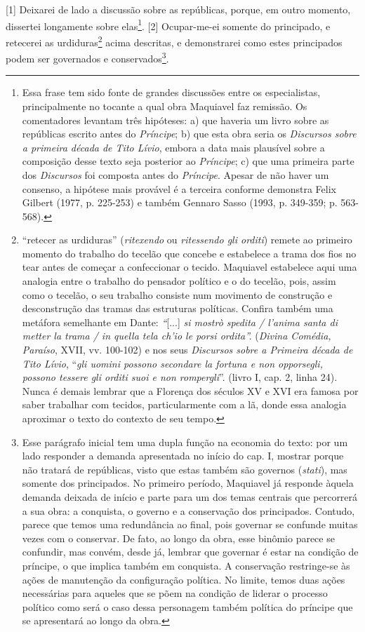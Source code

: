 {[}1{]} Deixarei de lado a discussão sobre as repúblicas, porque, em
outro momento, dissertei longamente sobre elas\footnote{Essa frase tem
  sido fonte de grandes discussões entre os especialistas,
  principalmente no tocante a qual obra Maquiavel faz remissão. Os
  comentadores levantam três hipóteses: a) que haveria um livro sobre as
  repúblicas escrito antes do \emph{Príncipe}; b) que esta obra seria os
  \emph{Discursos sobre a primeira década de Tito Lívio}, embora a data
  mais plausível sobre a composição desse texto seja posterior ao
  \emph{Príncipe}; c) que uma primeira parte dos \emph{Discursos} foi
  composta antes do \emph{Príncipe}. Apesar de não haver um consenso, a
  hipótese mais provável é a terceira conforme demonstra Felix Gilbert
  (1977, p. 225-253) e também Gennaro Sasso (1993, p. 349-359; p.
  563-568).}. {[}2{]} Ocupar-me-ei somente do principado, e retecerei as
urdiduras\footnote{``retecer as urdiduras'' (\emph{ritexendo} ou
  \emph{ritessendo gli orditi}) remete ao primeiro momento do trabalho
  do tecelão que concebe e estabelece a trama dos fios no tear antes de
  começar a confeccionar o tecido. Maquiavel estabelece aqui uma
  analogia entre o trabalho do pensador político e o do tecelão, pois,
  assim como o tecelão, o seu trabalho consiste num movimento de
  construção e desconstrução das tramas das estruturas políticas.
  Confira também uma metáfora semelhante em Dante: \emph{``}{[}...{]}
  \emph{si mostrò spedita / l'anima santa di metter la trama / in quella
  tela ch'io le porsi ordita''.} (\emph{Divina Comédia, Paraíso}, XVII,
  vv. 100-102) e nos seus \emph{Discursos sobre a Primeira década de
  Tito Lívio}, ``\emph{gli uomini possono secondare la fortuna e non
  opporsegli, possono tessere gli orditi suoi e non rompergli}''. (livro
  I, cap. 2, linha 24). Nunca é demais lembrar que a Florença dos
  séculos XV e XVI era famosa por saber trabalhar com tecidos,
  particularmente com a lã, donde essa analogia aproximar o texto do
  contexto de seu tempo.} acima descritas, e demonstrarei como estes
principados podem ser governados e conservados\footnote{Esse parágrafo
  inicial tem uma dupla função na economia do texto: por um lado
  responder a demanda apresentada no início do cap. I, mostrar porque
  não tratará de repúblicas, visto que estas também são governos
  (\emph{stati}), mas somente dos principados. No primeiro período,
  Maquiavel já responde àquela demanda deixada de início e parte para um
  dos temas centrais que percorrerá a sua obra: a conquista, o governo e
  a conservação dos principados. Contudo, parece que temos uma
  redundância ao final, pois governar se confunde muitas vezes com o
  conservar. De fato, ao longo da obra, esse binômio parece se
  confundir, mas convém, desde já, lembrar que governar é estar na
  condição de príncipe, o que implica também em conquista. A conservação
  restringe-se às ações de manutenção da configuração política. No
  limite, temos duas ações necessárias para aqueles que se põem na
  condição de liderar o processo político como será o caso dessa
  personagem também política do príncipe que se apresentará ao longo da
  obra.}.


